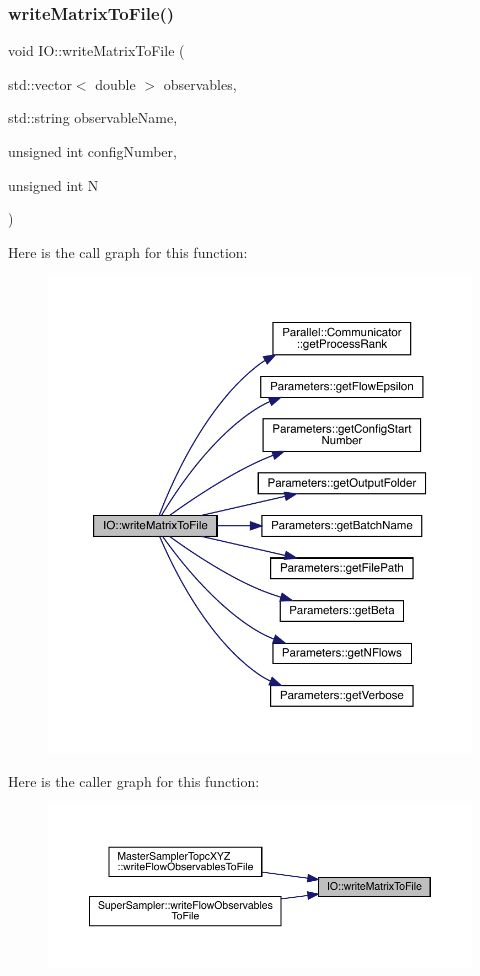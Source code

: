 \subsubsection{\texorpdfstring{writeMatrixToFile()}{writeMatrixToFile()}}
{\footnotesize\ttfamily void I\+O\+::write\+Matrix\+To\+File (\begin{DoxyParamCaption}\item[{std\+::vector$<$ double $>$}]{observables,  }\item[{std\+::string}]{observable\+Name,  }\item[{unsigned int}]{config\+Number,  }\item[{unsigned int}]{N }\end{DoxyParamCaption})}

Here is the call graph for this function\+:\nopagebreak
\begin{figure}[H]
\begin{center}
\leavevmode
\includegraphics[width=350pt]{namespace_i_o_ad77b7dd770afc8e2eb433d6187ea3616_cgraph}
\end{center}
\end{figure}
Here is the caller graph for this function\+:\nopagebreak
\begin{figure}[H]
\begin{center}
\leavevmode
\includegraphics[width=350pt]{namespace_i_o_ad77b7dd770afc8e2eb433d6187ea3616_icgraph}
\end{center}
\end{figure}
